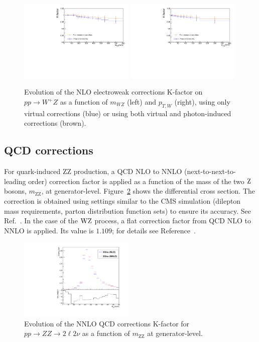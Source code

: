 \begin{figure}[!bhtp]
  \centering
  \includegraphics[width=0.49\textwidth]{figures/WZ_NLOEW_mWZ_ULB.pdf}
  \includegraphics[width=0.49\textwidth]{figures/WZ_NLOEW_pTW_ULB.pdf}
  \caption{Evolution of the NLO electroweak corrections K-factor on $pp \to W^+Z$ as a function of $m_{WZ}$ (left) and $p_{T,W}$ (right), using only virtual corrections (blue) or using both virtual and photon-induced corrections (brown).
  \label{fig:gammaInduced_WZ}}
\end{figure}

\clearpage
\subsection{QCD corrections}
For quark-induced ZZ production, a QCD NLO to NNLO (next-to-next-to-leading order)
correction factor is applied as a function of the mass of the two $\mathrm{Z}$ bosons,
$m_\mathrm{ZZ}$, at generator-level.
Figure~\ref{fig:NNLO_QCD_corrections} shows the differential cross section.
The correction is obtained using settings similar to the CMS simulation (dilepton mass requirements,
parton distribution function sets) to ensure its accuracy. See Ref.~\cite{Grazzini:2015hta}.
In the case of the $\mathrm{W}\mathrm{Z}$ process, a flat correction factor from QCD NLO to NNLO is applied.
Its value is $\mathbf{1.109}$; for details see Reference~\cite{Grazzini:2016swo}.


\begin{figure}[htp]
  \centering
  \includegraphics[width=0.49\textwidth]{figures/ZZ_NNLO_QCD_corrections.pdf} 
  \caption{Evolution of the NNLO QCD corrections K-factor for $pp \to ZZ \to 2\ell2\nu$ as a function of $m_\mathrm{ZZ}$ at generator-level.} 
  \label{fig:NNLO_QCD_corrections}
\end{figure} 

